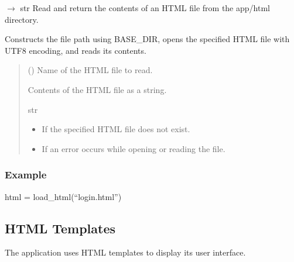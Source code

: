 \documentclass[letterpaper,10pt,english]{sphinxmanual}
\begin{document}
\begin{fulllineitems}
\label{\detokenize{modules:app.utils.load_html}}
\pysigstartsignatures
\pysiglinewithargsret
{}
{}
{{ $\rightarrow$ str}}
\pysigstopsignatures
\sphinxAtStartPar
Read and return the contents of an HTML file from the app/html directory.

\sphinxAtStartPar
Constructs the file path using BASE\_DIR, opens the specified HTML
file with UTF\sphinxhyphen{}8 encoding, and reads its contents.
\begin{quote}\begin{description}
\sphinxAtStartPar
{} () \textendash{} Name of the HTML file to read.

\sphinxAtStartPar
Contents of the HTML file as a string.

\sphinxAtStartPar
str

\begin{itemize}
\item {} 
\sphinxAtStartPar
{} \textendash{} If the specified HTML file does not exist.

\item {} 
\sphinxAtStartPar
{} \textendash{} If an error occurs while opening or reading the file.

\end{itemize}

\end{description}\end{quote}
\subsubsection*{Example}

\sphinxAtStartPar
html = load\_html(“login.html”)

\end{fulllineitems}



\subsection{HTML Templates}
\label{\detokenize{modules:html-templates}}
\sphinxAtStartPar
The application uses HTML templates to display its user interface.
\end{document}
